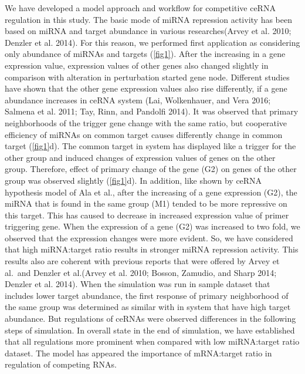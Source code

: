 \documentclass[]{article}
\begin{document}
We have developed a model approach and workflow for competitive ceRNA
regulation in this study. The basic mode of miRNA repression activity
has been based on miRNA and target abundance in various researches(Arvey
et al. 2010; Denzler et al. 2014). For this reason, we performed first
application as considering only abundance of miRNAs and targets
(\autoref{fig1}). After the increasing in a gene expression value,
expression values of other genes also changed slightly in comparison
with alteration in perturbation started gene node. Different studies
have shown that the other gene expression values also rise differently,
if a gene abundance increases in ceRNA system (Lai, Wolkenhauer, and
Vera 2016; Salmena et al. 2011; Tay, Rinn, and Pandolfi 2014). It was
observed that primary neighborhoods of the trigger gene change with the
same ratio, but cooperative efficiency of miRNAs on common target causes
differently change in common target (\autoref{fig1}d). The common target
in system has displayed like a trigger for the other group and induced
changes of expression values of genes on the other group. Therefore,
effect of primary change of the gene (G2) on genes of the other group
was observed slightly (\autoref{fig1}d). In addition, like shown by
ceRNA hypothesis model of Ala et al., after the increasing of a gene
expression (G2), the miRNA that is found in the same group (M1) tended
to be more repressive on this target. This has caused to decrease in
increased expression value of primer triggering gene. When the
expression of a gene (G2) was increased to two fold, we observed that
the expression changes were more evident. So, we have considered that
high miRNA:target ratio results in stronger miRNA repression activity.
This results also are coherent with previous reports that were offered
by Arvey et al.~and Denzler et al.(Arvey et al. 2010; Bosson, Zamudio,
and Sharp 2014; Denzler et al. 2014). When the simulation was run in
sample dataset that includes lower target abundance, the first response
of primary neighborhood of the same group was determined as similar with
in system that have high target abundance. But regulations of ceRNAs
were observed differences in the following steps of simulation. In
overall state in the end of simulation, we have established that all
regulations more prominent when compared with low miRNA:target ratio
dataset. The model has appeared the importance of mRNA:target ratio in
regulation of competing RNAs.
\end{document}
